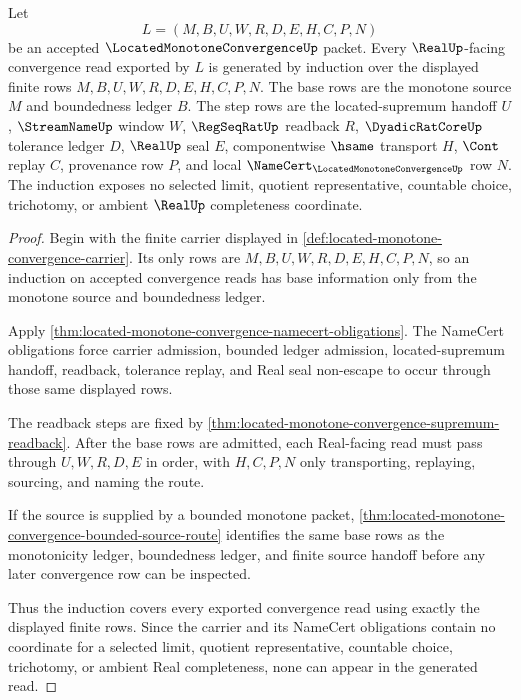 \begin{theorem}
\label{thm:located-monotone-convergence-source-induction}
Let
$$
L=(M,B,U,W,R,D,E,H,C,P,N)
$$
be an accepted $\LocatedMonotoneConvergenceUp$ packet. Every $\RealUp$-facing convergence read exported by $L$ is generated by induction over the displayed finite rows $M,B,U,W,R,D,E,H,C,P,N$. The base rows are the monotone source $M$ and boundedness ledger $B$. The step rows are the located-supremum handoff $U$, $\StreamNameUp$ window $W$, $\RegSeqRatUp$ readback $R$, $\DyadicRatCoreUp$ tolerance ledger $D$, $\RealUp$ seal $E$, componentwise $\hsame$ transport $H$, $\Cont$ replay $C$, provenance row $P$, and local $\NameCert_{\LocatedMonotoneConvergenceUp}$ row $N$. The induction exposes no selected limit, quotient representative, countable choice, trichotomy, or ambient $\RealUp$ completeness coordinate.
\end{theorem}
\begin{proof}
Begin with the finite carrier displayed in \autoref{def:located-monotone-convergence-carrier}. Its only rows are $M,B,U,W,R,D,E,H,C,P,N$, so an induction on accepted convergence reads has base information only from the monotone source and boundedness ledger.

Apply \autoref{thm:located-monotone-convergence-namecert-obligations}. The NameCert obligations force carrier admission, bounded ledger admission, located-supremum handoff, readback, tolerance replay, and Real seal non-escape to occur through those same displayed rows.

The readback steps are fixed by \autoref{thm:located-monotone-convergence-supremum-readback}. After the base rows are admitted, each Real-facing read must pass through $U,W,R,D,E$ in order, with $H,C,P,N$ only transporting, replaying, sourcing, and naming the route.

If the source is supplied by a bounded monotone packet, \autoref{thm:located-monotone-convergence-bounded-source-route} identifies the same base rows as the monotonicity ledger, boundedness ledger, and finite source handoff before any later convergence row can be inspected.

Thus the induction covers every exported convergence read using exactly the displayed finite rows. Since the carrier and its NameCert obligations contain no coordinate for a selected limit, quotient representative, countable choice, trichotomy, or ambient Real completeness, none can appear in the generated read.
\end{proof}

